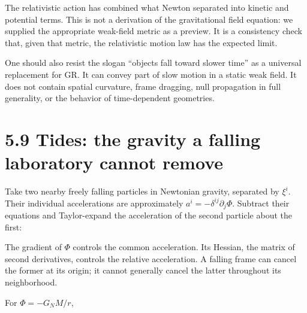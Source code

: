 \documentclass[
  11pt,
  letterpaper,
  oneside,
  openany]{scrbook}
\begin{document}
\begin{center}
\begingroup
{}
\ifdim\wd\grmathbox>\linewidth
\resizebox{\linewidth}{!}{\usebox{\grmathbox}}
\else\usebox{\grmathbox}\fi
\endgroup
\end{center}

The relativistic action has combined what Newton separated into kinetic
and potential terms. This is not a derivation of the gravitational field
equation: we supplied the appropriate weak-field metric as a preview. It
is a consistency check that, given that metric, the relativistic motion
law has the expected limit.

One should also resist the slogan ``objects fall toward slower time'' as
a universal replacement for GR. It can convey part of slow motion in a
static weak field. It does not contain spatial curvature, frame
dragging, null propagation in full generality, or the behavior of
time-dependent geometries.

\hypertarget{tides-the-gravity-a-falling-laboratory-cannot-remove}{%
\section{5.9 Tides: the gravity a falling laboratory cannot
remove}\label{tides-the-gravity-a-falling-laboratory-cannot-remove}}

Take two nearby freely falling particles in Newtonian gravity, separated
by \(\xi^i\). Their individual accelerations are approximately
\(a^i=-\delta^{ij}\partial_j\Phi\). Subtract their equations and
Taylor-expand the acceleration of the second particle about the first:

\begin{center}
\begingroup
{}
\ifdim\wd\grmathbox>\linewidth
\resizebox{\linewidth}{!}{\usebox{\grmathbox}}
\else\usebox{\grmathbox}\fi
\endgroup
\end{center}

The gradient of \(\Phi\) controls the common acceleration. Its Hessian,
the matrix of second derivatives, controls the relative acceleration. A
falling frame can cancel the former at its origin; it cannot generally
cancel the latter throughout its neighborhood.

For \(\Phi=-G_NM/r\),
\end{document}
